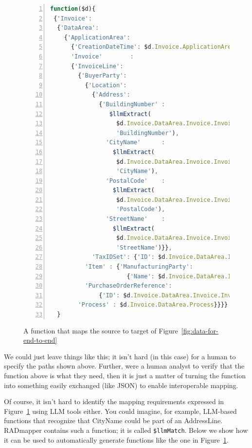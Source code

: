 \documentclass[10pt,letterpaper]{article} %
\newcommand{\stt}[1]{\texttt{#1}} %
\begin{document}
\begin{figure}[H]
  \caption{A function that maps the source to target of Figure~\ref{fig:data-for-end-to-end}}
  \label{fig:mapping-src2tar}
\begin{lstlisting}[language=JavaScript,numberstyle=\scriptsize,basicstyle=\ttfamily\scriptsize,numbers=left,stepnumber=1,breaklines=true]
function($d){
 {'Invoice':
  {'DataArea':
    {'ApplicationArea':
      {'CreationDateTime': $d.Invoice.ApplicationArea.CreationDateTime},
      'Invoice'        :
      {'InvoiceLine':
        {'BuyerParty':
          {'Location':
            {'Address':
              {'BuildingNumber' :
                 $llmExtract(
                   $d.Invoice.DataArea.Invoice.InvoiceLine.BuyerParty.Location.Address.AddressLine,
                   'BuildingNumber'),
                'CityName'      :
                  $llmExtract(
                   $d.Invoice.DataArea.Invoice.InvoiceLine.BuyerParty.Location.Address.AddressLine,
                   'CityName'),
                'PostalCode'    :
                  $llmExtract(
                   $d.Invoice.DataArea.Invoice.InvoiceLine.BuyerParty.Location.Address.AddressLine,
                   'PostalCode'),
                'StreetName'    :
                  $llmExtract(
                   $d.Invoice.DataArea.Invoice.InvoiceLine.BuyerParty.Location.Address.AddressLine,
                   'StreetName')}},
            'TaxIDSet': {'ID': $d.Invoice.DataArea.Invoice.InvoiceLine.BuyerParty.TaxIDSet.ID}},
          'Item' : {'ManufacturingParty':
                      {'Name': $d.Invoice.DataArea.Invoice.InvoiceLine.Item.ManufacturingParty.Name}},
          'PurchaseOrderReference':
              {'ID': $d.Invoice.DataArea.Invoice.InvoiceHeader.PurchaseOrderReference.ID}},
        'Process' : $d.Invoice.DataArea.Process}}}}
  }
\end{lstlisting}
\end{figure} \vspace{-3em}

We could just leave things like this; it isn't hard (in this case) for a human to specify the paths shown above.
Further, were a human analyst to verify that the function above is what they need, then it is just a matter of turning the function into something easily exchanged (like JSON) to enable interoperable mapping.

Of course, it isn't hard to identify the mapping requirements expressed in Figure~\ref{fig:mapping-src2tar} using LLM tools either.
You could imagine, for example, LLM-based functions that recognize that CityName could be part of an AddressLine.
RADmapper contains such a function; it is called \stt{\$llmMatch}.
Below we show how it can be used to automatically generate functions like the one in Figure~\ref{fig:mapping-src2tar}.
\end{document}
